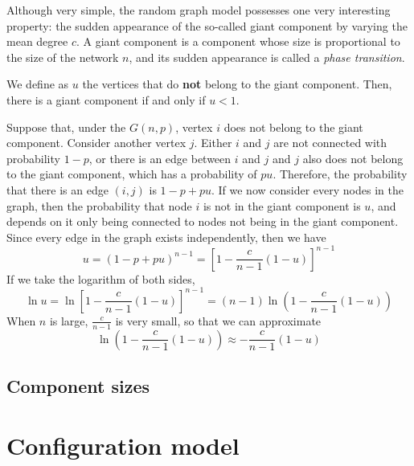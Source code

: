 Although very simple, the random graph model possesses one very interesting property: the sudden appearance of the so-called giant component by varying the mean degree $c$.
A giant component is a component whose size is proportional to the size of the network $n$, and its sudden appearance is called a \textit{phase transition}.

We define as $u$ the vertices that do \textbf{not} belong to the giant component.
Then, there is a giant component if and only if $u<1$.

Suppose that, under the $G(n,p)$, vertex $i$ does not belong to the giant component.
Consider another vertex $j$.
Either $i$ and $j$ are not connected with probability $1-p$, or there is an edge between $i$ and $j$ and $j$ also does not belong to the giant component, which has a probability of $pu$.
Therefore, the probability that there is an edge $(i,j)$ is $1-p + pu$.
If we now consider every nodes in the graph, then the probability that node $i$ is not in the giant component is $u$, and depends on it only being connected to nodes not being in the giant component.
Since every edge in the graph exists independently, then we have
\begin{equation}
	u = (1- p + pu)^{n-1} = \left[ 1 - \frac{c}{n-1} (1-u)\right]^{n-1}
\end{equation}
If we take the logarithm of both sides, 
\begin{equation}
	\ln u = \ln\left[ 1 - \frac{c}{n-1} (1-u)\right]^{n-1} = (n-1) \ln\left( 1-\frac{c}{n-1} (1-u)\right)
\end{equation}
When $n$ is large, $\frac{c}{n-1}$ is very small, so that we can approximate
\begin{equation}
	\ln\left( 1-\frac{c}{n-1} (1-u)\right) \approx - \frac{c}{n-1} (1-u)
\end{equation}











\subsection{Component sizes} %
\label{sub:component_sizes}




\section{Configuration model} %
\label{sec:configuration_model}

